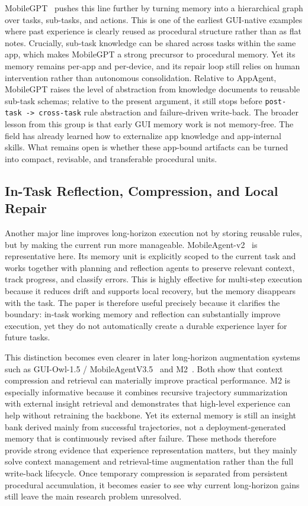 \documentclass{article}
\begin{document}
MobileGPT~\parencite{lee2024mobilegpt} pushes this line further by
turning memory into a hierarchical graph over tasks, sub-tasks, and
actions. This is one of the earliest GUI-native examples where past
experience is clearly reused as procedural structure rather than as flat
notes. Crucially, sub-task knowledge can be shared across tasks within
the same app, which makes MobileGPT a strong precursor to procedural
memory. Yet its memory remains per-app and per-device, and its repair
loop still relies on human intervention rather than autonomous
consolidation. Relative to AppAgent, MobileGPT raises the level of
abstraction from knowledge documents to reusable sub-task schemas;
relative to the present argument, it still stops before
\texttt{post-task\ -\textgreater{}\ cross-task} rule abstraction and
failure-driven write-back. The broader lesson from this group is that
early GUI memory work is not memory-free. The field has already learned
how to externalize app knowledge and app-internal skills. What remains
open is whether these app-bound artifacts can be turned into compact,
revisable, and transferable procedural units.

\subsection{In-Task Reflection, Compression, and Local
Repair}\label{52-in-task-reflection-compression-and-local-repair}

Another major line improves long-horizon execution not by storing
reusable rules, but by making the current run more manageable.
MobileAgent-v2~\parencite{wang2024mobileagentv2} is representative
here. Its memory unit is explicitly scoped to the current task and
works together with planning and reflection agents to preserve relevant
context, track progress, and classify errors. This is highly effective
for multi-step execution because it reduces drift and supports local
recovery, but the memory disappears with the task. The paper is
therefore useful precisely because it clarifies the boundary: in-task
working memory and reflection can substantially improve execution, yet
they do not automatically create a durable experience layer for future
tasks.

This distinction becomes even clearer in later long-horizon augmentation
systems such as GUI-Owl-1.5 /
MobileAgentV3.5~\parencite{xu2026mobileagentv35} and
M2~\parencite{yan2026m2}. Both show that context compression and
retrieval can materially improve practical performance. M2 is
especially informative because it combines recursive trajectory
summarization with external insight retrieval and demonstrates that
high-level experience can help without retraining the backbone. Yet its
external memory is still an insight bank derived mainly from successful
trajectories, not a deployment-generated memory that is continuously
revised after failure. These methods therefore provide strong evidence
that experience representation matters, but they mainly solve context
management and retrieval-time augmentation rather than the full
write-back lifecycle. Once temporary compression is separated from
persistent procedural accumulation, it becomes easier to see why
current long-horizon gains still leave the main research problem
unresolved.
\end{document}
